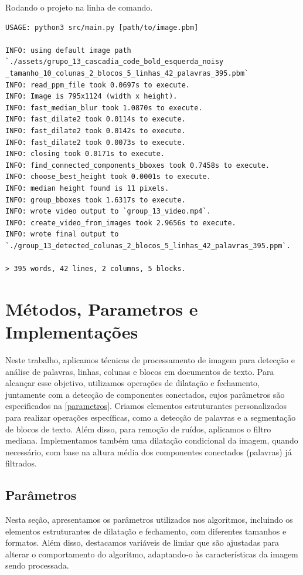 \documentclass[english, 
               brazil, 
               bsc] %
               {dcomp-abntex2}
\begin{document}
\begin{codigo}[h]
  \caption{\small Rodando o projeto na linha de comando.}
 \label{usage}
\begin{lstlisting}
USAGE: python3 src/main.py [path/to/image.pbm]

INFO: using default image path `./assets/grupo_13_cascadia_code_bold_esquerda_noisy
_tamanho_10_colunas_2_blocos_5_linhas_42_palavras_395.pbm`
INFO: read_ppm_file took 0.0697s to execute.
INFO: Image is 795x1124 (width x height).
INFO: fast_median_blur took 1.0870s to execute.
INFO: fast_dilate2 took 0.0114s to execute.
INFO: fast_dilate2 took 0.0142s to execute.
INFO: fast_dilate2 took 0.0073s to execute.
INFO: closing took 0.0171s to execute.
INFO: find_connected_components_bboxes took 0.7458s to execute.
INFO: choose_best_height took 0.0001s to execute.
INFO: median height found is 11 pixels.
INFO: group_bboxes took 1.6317s to execute.
INFO: wrote video output to `group_13_video.mp4`.
INFO: create_video_from_images took 2.9656s to execute.
INFO: wrote final output to `./group_13_detected_colunas_2_blocos_5_linhas_42_palavras_395.ppm`.

> 395 words, 42 lines, 2 columns, 5 blocks.
\end{lstlisting}
\end{codigo}


\chapter{Métodos, Parametros e Implementações}\label{ch-detalhes}

Neste trabalho, aplicamos técnicas de processamento de imagem para detecção e análise de palavras, linhas, colunas e blocos em documentos de texto. Para alcançar esse objetivo, utilizamos operações de dilatação e fechamento, juntamente com a detecção de componentes conectados, cujos parâmetros são especificados na \autoref{parametros}. Criamos elementos estruturantes personalizados para realizar operações específicas, como a detecção de palavras e a segmentação de blocos de texto. Além disso, para remoção de ruídos, aplicamos o filtro mediana. Implementamos também uma dilatação condicional da imagem, quando necessário, com base na altura média dos componentes conectados (palavras) já filtrados.

\section{Parâmetros} \label{parametros}
Nesta seção, apresentamos os parâmetros utilizados nos algoritmos, incluindo os elementos estruturantes de dilatação e fechamento, com diferentes tamanhos e formatos. Além disso, destacamos variáveis de limiar que são ajustadas para alterar o comportamento do algoritmo, adaptando-o às características da imagem sendo processada.
\end{document}
